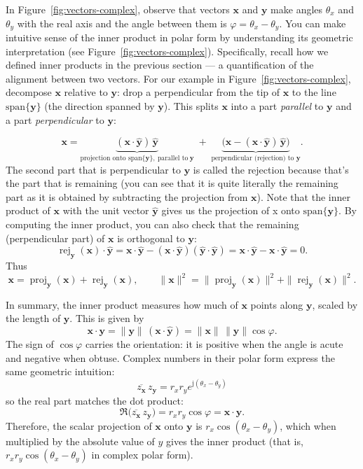 In Figure~\ref{fig:vectors-complex}, observe that vectors $\mathbf{x}$ and $\mathbf{y}$ make angles $\theta_x$ and $\theta_y$ with the real axis and the angle between them is $\varphi=\theta_x-\theta_y$. You can make intuitive sense of the inner product in polar form by understanding its geometric interpretation (see Figure~\ref{fig:vectors-complex}). Specifically, recall how we defined inner products in the previous section --- a quantification of the alignment between two vectors. For our example in Figure~\ref{fig:vectors-complex}, decompose $\mathbf{x}$ relative to $\mathbf{y}$: drop a perpendicular from the tip of $\mathbf{x}$ to the line $\mathrm{span}\{\mathbf{y}\}$ (the direction spanned by $\mathbf{y}$). This splits $\mathbf{x}$ into a part \emph{parallel} to $\mathbf{y}$ and a part \emph{perpendicular} to $\mathbf{y}$:
   
\[
\mathbf{x}
=\underbrace{(\mathbf{x}\cdot\hat{\mathbf{y}})\,\hat{\mathbf{y}}}_{\text{projection onto }\mathrm{span}\{\mathbf y\}, \: \text{parallel to} \: \mathbf y}
\;+\;
\underbrace{\Big(\mathbf{x}-(\mathbf{x}\cdot\hat{\mathbf{y}})\,\hat{\mathbf{y}}\Big)}_{\text{perpendicular (rejection) to }\mathbf y}.
\]
The second part that is perpendicular to $\mathbf y$ is called the rejection because that's the part that is remaining (you can see that it is quite literally the remaining part as it is obtained by subtracting the projection from $\mathbf{x}$). Note that the inner product of $\mathbf{x}$ with the unit vector $\hat{\mathbf{y}}$ gives us the projection of x onto $\mathrm{span}\{\mathbf{y}\}$. By computing the inner product, you can also check that the remaining (perpendicular part) of $\mathbf{x}$ is orthogonal to $\mathbf{y}$:
\[
\operatorname{rej}_{\mathbf y}(\mathbf x)\cdot \hat{\mathbf y}
=\mathbf x\!\cdot\!\hat{\mathbf y}-(\mathbf x\!\cdot\!\hat{\mathbf y})(\hat{\mathbf y}\!\cdot\!\hat{\mathbf y})
=\mathbf x\!\cdot\!\hat{\mathbf y}-\mathbf x\!\cdot\!\hat{\mathbf{y}}=0.
\]
Thus
\[
\mathbf x=\operatorname{proj}_{\mathbf y}(\mathbf x)+\operatorname{rej}_{\mathbf y}(\mathbf x),
\qquad
\|\mathbf x\|^2=\|\operatorname{proj}_{\mathbf y}(\mathbf x)\|^2+\|\operatorname{rej}_{\mathbf y}(\mathbf x)\|^2.
\]

In summary, the inner product measures how much of $\mathbf{x}$ points along $\mathbf{y}$, scaled by the length of $\mathbf{y}$. This is given by
    \[
      \mathbf{x}\cdot\mathbf{y}
      = \|\mathbf{y}\|\,(\mathbf{x}\cdot\hat{\mathbf{y}})
      = \|\mathbf{x}\|\,\|\mathbf{y}\|\cos\varphi.
    \]
The sign of $\cos\varphi$ carries the orientation: it is positive when the angle is acute and negative when obtuse. Complex numbers in their polar form express the same geometric intuition:
\[
      \overline{z_{\mathbf{x}}}\,z_{\mathbf{y}}
      = r_x r_y e^{\mathrm{j}(\theta_x-\theta_y)}
\]
so the real part matches the dot product:
\[
  \Re\!\big(\overline{z_{\mathbf{x}}}\,z_{\mathbf{y}}\big)
  = r_x r_y \cos\varphi
  = \mathbf{x}\cdot\mathbf{y}.
\]
Therefore, the scalar projection of $\textbf{x}$ onto $\textbf{y}$ is $r_x \cos(\theta_x - \theta_y)$, which when multiplied by the absolute value of $y$ gives the inner product (that is, $r_xr_y\cos(\theta_x - \theta_y)$ in complex polar form). 
